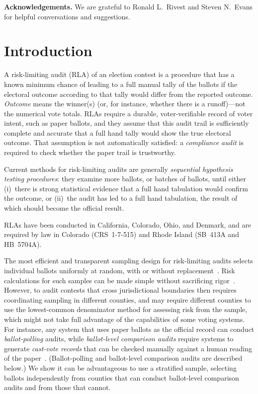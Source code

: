 \documentclass[runningheads]{llncs}
\begin{document}
\noindent
\textbf{Acknowledgements.}
We are grateful to Ronald L.~Rivest and Steven N.~Evans for helpful conversations and suggestions.

\section{Introduction}
A risk-limiting audit (RLA) of an election contest is a procedure that
has a known minimum chance of leading to a full manual tally of the ballots if the electoral outcome  according to that tally would differ from the reported outcome.
\emph{Outcome} means the winner(s) (or, for instance, whether there is a runoff)---not the numerical vote totals. 
RLAs require a durable, voter-verifiable record of voter intent, such as paper ballots,
and they assume that this audit trail is sufficiently complete and accurate that a full hand
tally would show the true electoral outcome.
That assumption is not automatically satisfied: a \emph{compliance audit}
\cite{starkWagner12} 
is required to check whether the paper trail is trustworthy.

Current methods for risk-limiting audits are generally \emph{sequential hypothesis testing procedures}: they examine more ballots, or batches of ballots,
until either (i)~there is strong statistical evidence that a full hand tabulation would confirm the outcome,
or (ii)~the audit has led to a full hand tabulation, the result of which should become the official
result.

RLAs have been conducted in California, Colorado, Ohio, and Denmark, and are required by law in Colorado (CRS~1-7-515) and Rhode Island (SB~413A and HB~5704A).

The most efficient and transparent sampling design for risk-limiting audits selects individual ballots uniformly at random, with or without replacement~\cite{stark10c}.
Risk calculations for such samples can be made simple without sacrificing rigor~\cite{stark10d,lindemanStark12}.
However, to audit contests that cross jurisdictional boundaries then requires coordinating sampling in different counties, and may require different counties to use the lowest-common denominator method for assessing risk from the sample, which might not take full advantage of the capabilities of some voting systems. 
For instance, any system that uses paper ballots as the official record can conduct \emph{ballot-polling} audits, while \emph{ballot-level comparison audits} require systems to generate \emph{cast-vote records} that can be checked manually against a human reading of the paper~\cite{lindemanEtal12,lindemanStark12}. 
(Ballot-polling and ballot-level comparison audits are described below.) 
We show it can be advantageous to use a stratified sample, selecting ballots independently from counties that can conduct ballot-level comparison audits and from those that cannot.  
\end{document}
